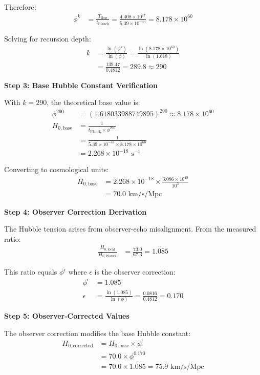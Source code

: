 Therefore:
\begin{align}
\phi^k &= \frac{T_{\text{flow}}}{t_{\text{Planck}}} = \frac{4.408 \times 10^{17}}{5.39 \times 10^{-44}} = 8.178 \times 10^{60}
\end{align}

Solving for recursion depth:
\begin{align}
k &= \frac{\ln(\phi^k)}{\ln(\phi)} = \frac{\ln(8.178 \times 10^{60})}{\ln(1.618)} \\
&= \frac{139.47}{0.4812} = 289.8 \approx 290
\end{align}

\textbf{Step 3: Base Hubble Constant Verification}

With $k = 290$, the theoretical base value is:
\begin{align}
\phi^{290} &= (1.618033988749895)^{290} \approx 8.178 \times 10^{60} \\
H_{0,\text{base}} &= \frac{1}{t_{\text{Planck}} \times \phi^{290}} \\
&= \frac{1}{5.39 \times 10^{-44} \times 8.178 \times 10^{60}} \\
&= 2.268 \times 10^{-18} \text{ s}^{-1}
\end{align}

Converting to cosmological units:
\begin{align}
H_{0,\text{base}} &= 2.268 \times 10^{-18} \times \frac{3.086 \times 10^{19}}{10^3} \\
&= 70.0 \text{ km/s/Mpc}
\end{align}

\textbf{Step 4: Observer Correction Derivation}

The Hubble tension arises from observer-echo misalignment. From the measured ratio:
\begin{align}
\frac{H_{0,\text{local}}}{H_{0,\text{Planck}}} &= \frac{73.0}{67.3} = 1.085
\end{align}

This ratio equals $\phi^{\epsilon}$ where $\epsilon$ is the observer correction:
\begin{align}
\phi^{\epsilon} &= 1.085 \\
\epsilon &= \frac{\ln(1.085)}{\ln(\phi)} = \frac{0.0816}{0.4812} = 0.170
\end{align}

\textbf{Step 5: Observer-Corrected Values}

The observer correction modifies the base Hubble constant:
\begin{align}
H_{0,\text{corrected}} &= H_{0,\text{base}} \times \phi^{\epsilon} \\
&= 70.0 \times \phi^{0.170} \\
&= 70.0 \times 1.085 = 75.9 \text{ km/s/Mpc}
\end{align}

